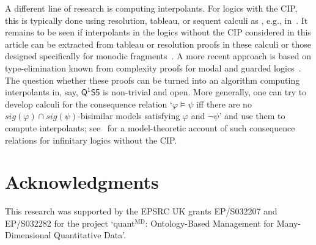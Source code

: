 \documentclass[10pt,a4paper]{amsart}
\theoremstyle{plain}
\theoremstyle{definition}
\newcommand{\sig}{\mathit{sig}}
\newcommand{\FOMS}{\ensuremath{\mathsf{Q^1S5}}}
\begin{document}
A different line of research is computing interpolants. For logics with the CIP, this is typically done using resolution, tableau, or sequent calculi as , e.g., in~\cite{DBLP:books/daglib/0082098,DBLP:conf/lpar/KovacsV17,DBLP:journals/apal/Kuznets18,DBLP:journals/jar/Wernhard21}. It remains to be seen if interpolants in the logics without the CIP considered in this article can be extracted from tableau or resolution proofs in these calculi or those designed specifically for monodic fragments~\cite{DBLP:conf/cade/LutzSWZ01,DBLP:journals/sLogica/LutzSWZ02,DBLP:journals/tocl/DegtyarevFK06}. A more recent approach is based on type-elimination known from complexity proofs for modal and guarded logics~\cite{DBLP:journals/tocl/BenediktCB16,baldernote}. The question whether these proofs can be turned into an algorithm computing interpolants in, say, \FOMS{} is non-trivial and open. More generally, one can try to develop calculi for the consequence relation `$\varphi \models \psi$ iff there are no $\sig(\varphi)\cap\sig(\psi)$-bisimilar models satisfying $\varphi$ and $\neg \psi$' and use them to compute interpolants; see~\cite{DBLP:journals/jsyml/BarwiseB99} for a model-theoretic account of such consequence relations for infinitary logics without the CIP. 

\section*{Acknowledgments}

This research was supported by the EPSRC UK grants EP/S032207 and EP/S032282 for the project `quant$^\text{MD}$: Ontology-Based Management for Many-Dimensional Quantitative Data'\!.


\end{document}

